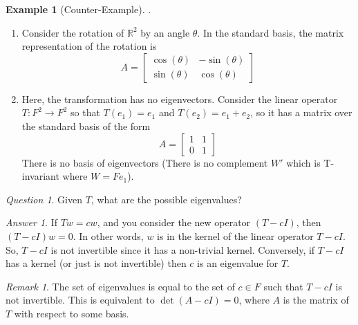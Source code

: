 \documentclass[12pt]{article}
\theoremstyle{definition}
\newtheorem{eg}[thm]{Example}
\theoremstyle{remark}
\newtheorem{rmk}[thm]{Remark}
\newtheorem*{qst}{Question}
\newtheorem*{ans}{Answer}
\numberwithin{equation}{section}
\newcommand\R{\mathbb R}    %
\begin{document}
\vspace{15pt}

\begin{eg}[Counter-Example]
        .\newline \begin{enumerate}
                \item Consider the rotation of $\R^2$ by an angle $\theta$. In the standard basis, the matrix representation of the rotation is \begin{equation} 
                                A = \begin{bmatrix} \cos(\theta) & -\sin(\theta) \\ \sin(\theta) & \cos(\theta) 
                        \end{bmatrix}
                \end{equation}
                \item Here, the transformation has no eigenvectors. Consider the linear operator $T: F^2 \rightarrow F^2$ so that $T(e_1) = e_1$ and $T(e_2) = e_1 + e_2$, so it has a matrix over the standard basis of the form \begin{equation} 
                                A = \begin{bmatrix} 1 & 1 \\ 0 & 1 \end{bmatrix}
                \end{equation}
                        There is no basis of eigenvectors (There is no complement $W'$ which is T-invariant where $W = Fe_1$).
        \end{enumerate}
\end{eg}

\vspace{15pt}

\begin{qst}
        Given $T$, what are the possible eigenvalues?
\end{qst}
\begin{ans}
        If $Tw = cw$, and you consider the new operator $(T-cI)$, then $(T-cI)w = 0$. In other words, $w$ is in the kernel of the linear operator $T-cI$. So, $T-cI$ is not invertible since it has a non-trivial kernel. Conversely, if $T-cI$ has a kernel (or just is not invertible) then $c$ is an eigenvalue for $T$.
\end{ans}

\vspace{15pt}

\begin{rmk}
        The set of eigenvalues is equal to the set of $c \in F$ such that $T-cI$ is not invertible. This is equivalent to $\det(A - cI) = 0$, where $A$ is the matrix of $T$ with respect to some basis.
\end{rmk}
\end{document}
